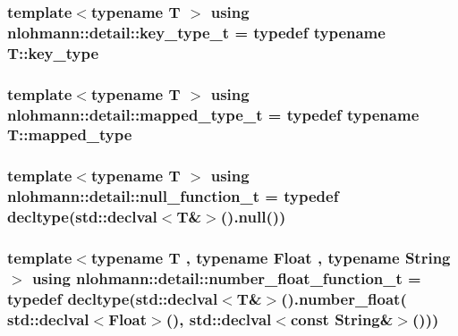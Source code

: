 \subsubsection[{\texorpdfstring{key\+\_\+type\+\_\+t}{key_type_t}}]{\setlength{\rightskip}{0pt plus 5cm}template$<$typename T $>$ using {\bf nlohmann\+::detail\+::key\+\_\+type\+\_\+t} = typedef typename T\+::key\+\_\+type}\hypertarget{namespacenlohmann_1_1detail_a66dfe39f03b05d6b7265a0ff748d64ef}{}\label{namespacenlohmann_1_1detail_a66dfe39f03b05d6b7265a0ff748d64ef}
\subsubsection[{\texorpdfstring{mapped\+\_\+type\+\_\+t}{mapped_type_t}}]{\setlength{\rightskip}{0pt plus 5cm}template$<$typename T $>$ using {\bf nlohmann\+::detail\+::mapped\+\_\+type\+\_\+t} = typedef typename T\+::mapped\+\_\+type}\hypertarget{namespacenlohmann_1_1detail_a9c1795c148875722f8482d39e0eb9364}{}\label{namespacenlohmann_1_1detail_a9c1795c148875722f8482d39e0eb9364}
\subsubsection[{\texorpdfstring{null\+\_\+function\+\_\+t}{null_function_t}}]{\setlength{\rightskip}{0pt plus 5cm}template$<$typename T $>$ using {\bf nlohmann\+::detail\+::null\+\_\+function\+\_\+t} = typedef decltype(std\+::declval$<$T\&$>$().null())}\hypertarget{namespacenlohmann_1_1detail_ac1b4e524746bf8b790b2b776048b93c4}{}\label{namespacenlohmann_1_1detail_ac1b4e524746bf8b790b2b776048b93c4}
\subsubsection[{\texorpdfstring{number\+\_\+float\+\_\+function\+\_\+t}{number_float_function_t}}]{\setlength{\rightskip}{0pt plus 5cm}template$<$typename T , typename Float , typename String $>$ using {\bf nlohmann\+::detail\+::number\+\_\+float\+\_\+function\+\_\+t} = typedef decltype(std\+::declval$<$T\&$>$().number\+\_\+float( std\+::declval$<$Float$>$(), std\+::declval$<$const String\&$>$()))}\hypertarget{namespacenlohmann_1_1detail_ad42df56e913abe26ed556e0e92f386f4}{}\label{namespacenlohmann_1_1detail_ad42df56e913abe26ed556e0e92f386f4}
